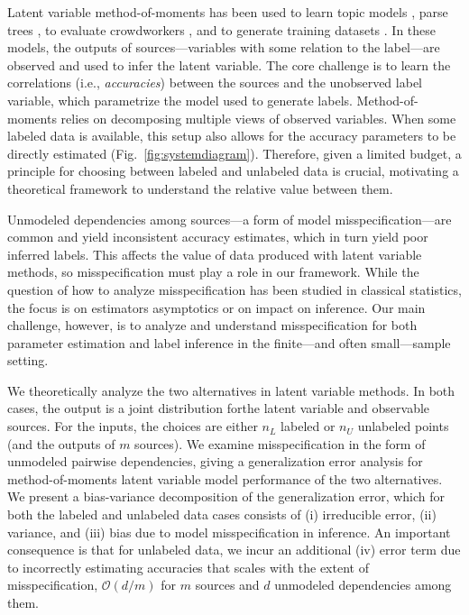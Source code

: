 Latent variable method-of-moments has been used to learn topic models \citep{anandkumar2014tensor}, parse trees \citep{Hsu12}, to evaluate crowdworkers \citep{joglekar2013evaluating}, and to generate training datasets \citep{Ratner19, fu2020fast}.
In these models, the outputs of sources---variables with some relation to the label---are observed and used to infer the latent variable. The core challenge is to learn the correlations (i.e., \emph{accuracies}) between the sources and the unobserved label variable, which parametrize the model used to generate labels.
Method-of-moments relies on decomposing multiple views of observed variables. When some labeled data is available, this setup also allows for the accuracy parameters to be directly estimated (Fig.~\ref{fig:systemdiagram}).
Therefore, given a limited budget, a principle for choosing between labeled and unlabeled data is crucial, motivating a theoretical framework to understand the relative value between them.

Unmodeled dependencies among sources---a form of model misspecification---are common and yield inconsistent accuracy estimates, which in turn yield poor inferred labels. This affects the value of data produced with latent variable methods, so misspecification must play a role in our framework. While the question of how to analyze misspecification has been studied in classical statistics, the focus is on estimators asymptotics \citep{kleijn2006, kleijn2012} or on impact on inference. Our main challenge, however, is to analyze and understand misspecification for both parameter estimation and label inference in the finite---and often small---sample setting.



We theoretically analyze the two alternatives in latent variable methods. In both cases, the output is a joint distribution forthe latent variable and observable sources. For the inputs, the choices are either $n_L$ labeled or $n_U$ unlabeled points (and the outputs of $m$ sources). We examine misspecification in the form of unmodeled pairwise dependencies, giving a generalization error analysis for method-of-moments latent variable model performance of the two alternatives. We present a bias-variance decomposition of the generalization error, which for both the labeled and unlabeled data cases consists of (i) irreducible error, (ii) variance, and (iii) bias due to model misspecification in inference. An important consequence is that for unlabeled data, we incur an additional (iv) error term due to incorrectly estimating accuracies that scales with the extent of misspecification, $\mathcal{O}(d/m)$ for $m$ sources and $d$ unmodeled dependencies among them. 

